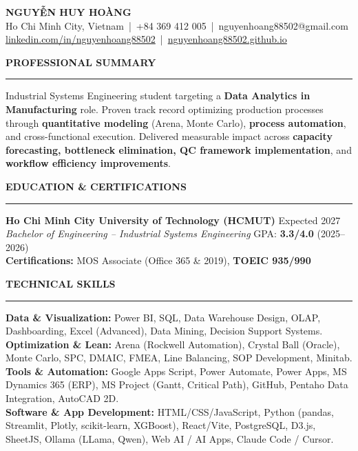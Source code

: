 \documentclass[10pt,a4paper]{article}
\newcommand{\sectionrule}[1]{%
  {\large\textbf{#1}}\\[-4pt]
  {\rule{\linewidth}{0.8pt}}
}
\begin{document}
\pagestyle{empty}

\begin{center}
  {\LARGE \textbf{NGUYỄN HUY HOÀNG}}\\[2pt]
  {\small Ho Chi Minh City, Vietnam \,|\, +84 369 412 005 \,|\, nguyenhoang88502@gmail.com}\\[1pt]
  {\small
    \href{https://www.linkedin.com/in/nguyenhoang88502}{linkedin.com/in/nguyenhoang88502}
    \,|\,
    \href{https://nguyenhoang88502.github.io/}{nguyenhoang88502.github.io}
  }
\end{center}

\vspace{3pt}

\sectionrule{PROFESSIONAL SUMMARY}
{\small Industrial Systems Engineering student targeting a \textbf{Data Analytics in Manufacturing} role. Proven track record optimizing production processes through \textbf{quantitative modeling} (Arena, Monte Carlo), \textbf{process automation}, and cross-functional execution. Delivered measurable impact across \textbf{capacity forecasting, bottleneck elimination, QC framework implementation}, and \textbf{workflow efficiency improvements}.}

\vspace{10pt}

\sectionrule{EDUCATION \& CERTIFICATIONS}
\textbf{Ho Chi Minh City University of Technology (HCMUT)} \hfill {\small Expected 2027}\\
{\small \textit{Bachelor of Engineering -- Industrial Systems Engineering} \hfill GPA: \textbf{3.3/4.0} (2025--2026)\\
\textbf{Certifications:} MOS Associate (Office 365 \& 2019), \textbf{TOEIC 935/990}}
\vspace{10pt}


\sectionrule{TECHNICAL SKILLS}
{\small\RaggedRight
\textbf{Data \& Visualization:} Power BI, SQL, Data Warehouse Design, OLAP, Dashboarding, Excel (Advanced), Data Mining, Decision Support Systems.\\[1pt]
\textbf{Optimization \& Lean:} Arena (Rockwell Automation), Crystal Ball (Oracle), Monte Carlo, SPC, DMAIC, FMEA, Line Balancing, SOP Development, Minitab.\\[1pt]
\textbf{Tools \& Automation:} Google Apps Script, Power Automate, Power Apps, MS Dynamics 365 (ERP), MS Project (Gantt, Critical Path), GitHub, Pentaho Data Integration, AutoCAD 2D.\\[1pt]
\textbf{Software \& App Development:} HTML/CSS/JavaScript, Python (pandas, Streamlit, Plotly, scikit-learn, XGBoost), React/Vite, PostgreSQL, D3.js, SheetJS, Ollama (LLama, Qwen), Web AI / AI Apps, Claude Code / Cursor.
}
\end{document}
